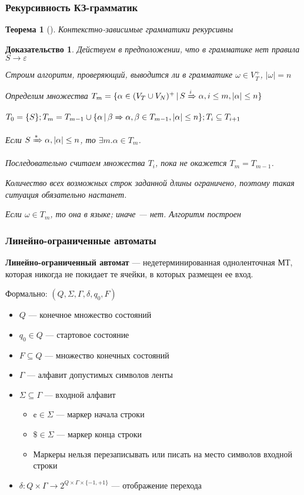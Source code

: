 \documentclass{beamer}
\newtheorem{rutheorem}{Теорема}
\newtheorem{ruproof}{Доказательство}
\newcommand{\derive}[0]{\xRightarrow[]{*}}
\newcommand{\derives}[0]{\xRightarrow[]{}}
\newcommand{\derivek}[1]{\xRightarrow[]{#1}}
\begin{document}
\begin{frame}[fragile]
  \transwipe[direction=90]
  \frametitle{Рекурсивность КЗ-грамматик}
  \begin{rutheorem}[]
  Контекстно-зависимые грамматики рекурсивны
  \end{rutheorem}


  \begin{ruproof}
  Действуем в предположении, что в грамматике нет правила $S \rightarrow \varepsilon$

  Строим алгоритм, проверяющий, выводится ли в грамматике $\omega \in V_T^+$, $|\omega| = n$

  Определим множества $T_m = \{ \alpha \in (V_T \cup V_N)^+\, | \, S \derivek{i} \alpha, i \leq m, | \alpha | \leq n \}$

  $T_0 =\{ S \}; T_m = T_{m-1} \cup \{ \alpha \, | \, \beta \derives \alpha, \beta \in T_{m-1}, | \alpha | \leq n \}; T_i \subseteq T_{i+1}$

  Если $S \derive \alpha, | \alpha | \leq n $, то $\exists m. \alpha \in T_m$.

  Последовательно считаем множества $T_i$, пока не окажется $T_m = T_{m-1}$.

  Количество всех возможных строк заданной длины ограничено, поэтому такая ситуация обязательно настанет.

  Если $\omega \in T_m$, то она в языке; иначе --- нет. Алгоритм построен
  \end{ruproof}

\end{frame}

\begin{frame}[fragile]
  \transwipe[direction=90]
  \frametitle{Линейно-ограниченные автоматы}
  \textbf{Линейно-ограниченный автомат} --- недетерминированная одноленточная МТ, которая никогда не покидает те ячейки, в которых размещен ее вход.

  Формально: $(Q, \Sigma, \Gamma, \delta, q_0, F)$
  \begin{itemize}
    \item $Q$ --- конечное множество состояний
    \item $q_0 \in Q$ --- стартовое состояние
    \item $F \subseteq Q$ --- множество конечных состояний
    \item $\Gamma$ --- алфавит допустимых символов ленты
    \item $\Sigma \subseteq \Gamma$ --- входной алфавит
    \begin{itemize}
      \item $\cent \in \Sigma$ --- маркер начала строки
      \item $\$ \in \Sigma$ --- маркер конца строки
      \item Маркеры нельзя перезаписывать или писать на место символов входной строки
    \end{itemize}
    \item $\delta: Q \times \Gamma \rightarrow 2^{Q \times \Gamma \times \{ -1, +1\} }$ --- отображение перехода
  \end{itemize}

\end{frame}
\end{document}
